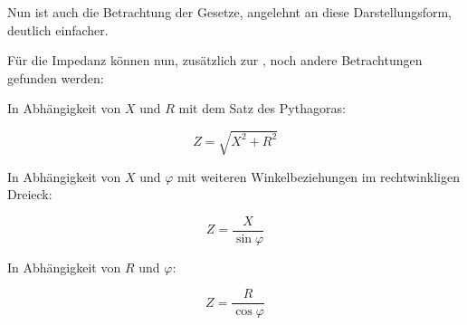 Nun ist auch die Betrachtung der Gesetze, angelehnt an diese Darstellungsform, deutlich einfacher.


Für die Impedanz können nun, zusätzlich zur , noch andere Betrachtungen gefunden werden:

In Abhängigkeit von $X$ und $R$ mit dem Satz des Pythagoras:

\begin{equation}	\label{eq:ImepdanzXR}
	Z = \sqrt{X^2 + R^2}
\end{equation}


\noindent In Abhängigkeit von $X$ und $\varphi$ mit weiteren Winkelbeziehungen im rechtwinkligen Dreieck:

\begin{equation}	\label{eq:ImepdanzXphi}
	Z = \frac{X}{\sin\varphi}
\end{equation}


\noindent In Abhängigkeit von $R$ und $\varphi$:

\begin{equation}	\label{eq:ImepdanzRphi}
	Z = \frac{R}{\cos\varphi}
\end{equation}